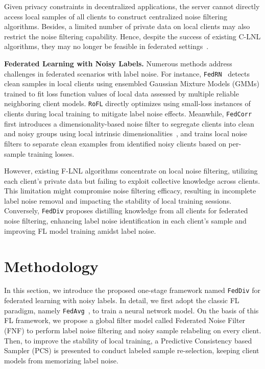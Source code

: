 \documentclass[letterpaper]{article} %
\begin{document}
Given privacy constraints in decentralized applications, the server cannot directly access local samples of all clients to construct centralized noise filtering algorithms. Besides, a limited number of private data on local clients may also restrict the noise filtering capability. Hence, despite the success of existing C-LNL algorithms, they may no longer be feasible in federated settings~\cite{xu2022fedcorr}. 

\noindent
\textbf{Federated Learning with Noisy Labels.}
Numerous methods address challenges in federated scenarios with label noise. For instance, \texttt{FedRN}~\cite{kim2022fedrn} detects clean samples in local clients using ensembled Gaussian Mixture Models (GMMs) trained to fit loss function values of local data assessed by multiple reliable neighboring client models. \texttt{RoFL} \cite{RoFL} directly optimizes using small-loss instances of clients during local training to mitigate label noise effects. Meanwhile, \texttt{FedCorr}\cite{xu2022fedcorr} first introduces a dimensionality-based noise filter to segregate clients into clean and noisy groups using local intrinsic dimensionalities~\cite{LID}, and trains local noise filters to separate clean examples from identified noisy clients based on per-sample training losses.

However, existing F-LNL algorithms concentrate on local noise filtering, utilizing each client's private data but failing to exploit collective knowledge across clients. This limitation might compromise noise filtering efficacy, resulting in incomplete label noise removal and impacting the stability of local training sessions. Conversely, \texttt{FedDiv} proposes distilling knowledge from all clients for federated noise filtering, enhancing label noise identification in each client's sample and improving FL model training amidst label noise.

\section{Methodology}

In this section, we introduce the proposed one-stage framework named \texttt{FedDiv} for federated learning with noisy labels. In detail, we first adopt the classic FL paradigm, namely \texttt{FedAvg}~\cite{FedAvg}, to train a neural network model. On the basis of this FL framework, we propose a global filter model called Federated Noise Filter (FNF) to perform label noise filtering and noisy sample relabeling on every client. Then, to improve the stability of local training, a Predictive Consistency based Sampler (PCS) is presented to conduct labeled sample re-selection, keeping client models from memorizing label noise. 
 
\end{document}
